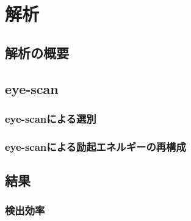 \documentclass[../master]{document}
\begin{document}
\chapter{解析}
%
%
%
\section{解析の概要}

\section{eye-scan}
\subsection{eye-scanによる選別}
\subsection{eye-scanによる励起エネルギーの再構成}

\section{結果}
\subsection{検出効率}
\end{document}
